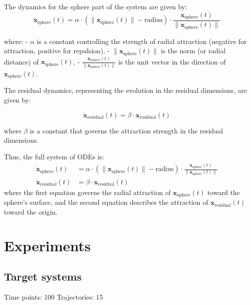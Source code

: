 \documentclass{article}
\theoremstyle{definition} \newtheorem{definition}{Definition}  \newtheorem{example}{Example}
\theoremstyle{remark} \newtheorem{remark}{Remark}
\newcounter{ct}
\begin{document}
The dynamics for the sphere part of the system are given by:
\[
\dot{\mathbf{x}}_{\text{sphere}}(t) = \alpha \cdot \left( \| \mathbf{x}_{\text{sphere}}(t) \| - \text{radius} \right) \cdot \frac{\mathbf{x}_{\text{sphere}}(t)}{\|\mathbf{x}_{\text{sphere}}(t)\|}
\]

where:
- \( \alpha \) is a constant controlling the strength of radial attraction (negative for attraction, positive for repulsion),
- \( \| \mathbf{x}_{\text{sphere}}(t) \| \) is the norm (or radial distance) of \( \mathbf{x}_{\text{sphere}}(t) \),
- \( \frac{\mathbf{x}_{\text{sphere}}(t)}{\|\mathbf{x}_{\text{sphere}}(t)\|} \) is the unit vector in the direction of \( \mathbf{x}_{\text{sphere}}(t) \).

The residual dynamics, representing the evolution in the residual dimensions, are given by:

\[
\dot{\mathbf{x}}_{\text{residual}}(t) = \beta \cdot \mathbf{x}_{\text{residual}}(t)
\]

where \( \beta \) is a constant that governs the attraction strength in the residual dimensions.

Thus, the full system of ODEs is:
\[
\begin{aligned}
\dot{\mathbf{x}}_{\text{sphere}}(t) &= \alpha \cdot \left( \| \mathbf{x}_{\text{sphere}}(t) \| - \text{radius} \right) \cdot \frac{\mathbf{x}_{\text{sphere}}(t)}{\|\mathbf{x}_{\text{sphere}}(t)\|} \\
\dot{\mathbf{x}}_{\text{residual}}(t) &= \beta \cdot \mathbf{x}_{\text{residual}}(t)
\end{aligned}
\]
where the first equation governs the radial attraction of \( \mathbf{x}_{\text{sphere}}(t) \) toward the sphere's surface, and the second equation describes the attraction of \( \mathbf{x}_{\text{residual}}(t) \) toward the origin.




\newpage
\section{Experiments}
\subsection{}


 \subsection{Target systems}\label{sec:target_systems}
 Time points: 100
 Trajectories: 15
\end{document}

